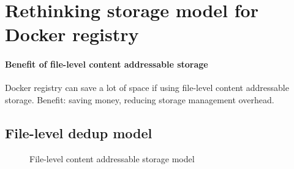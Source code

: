 \section{Rethinking storage model for Docker registry}
\label{sec:file_adressable}

\paragraph{Benefit of file-level content addressable storage}
Docker registry can save a lot of space if using file-level content addressable storage. 
Benefit: saving money, reducing storage management overhead.

\subsection{File-level dedup model}

\begin{figure}
	\centering
	\caption{File-level content addressable storage model}
	\label{fig:eval-stdev-erasure-cnt}
\end{figure}

